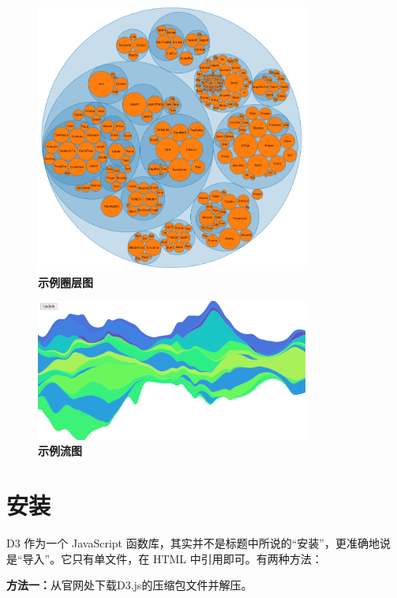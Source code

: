 \begin{figure}[htbp]
    \centering
    \includegraphics[width=0.8\textwidth]{figure/D3/example_circle_packing.png}
    \caption{\textbf{示例圈层图}}
    \label{fig:example_circle_packing}
\end{figure}



\begin{figure}[htbp]
    \centering
    \includegraphics[width=0.8\textwidth]{figure/D3/example_stream_graph.png}
    \caption{\textbf{示例流图}}
    \label{fig:example_stream_graph}
\end{figure}


\section{安装}

D3 作为一个 JavaScript 函数库，其实并不是标题中所说的``安装''，更准确地说是``导入''。它只有单文件，在 HTML 中引用即可。有两种方法：

\textbf{方法一：}从官网处下载D3.js的压缩包文件并解压。

